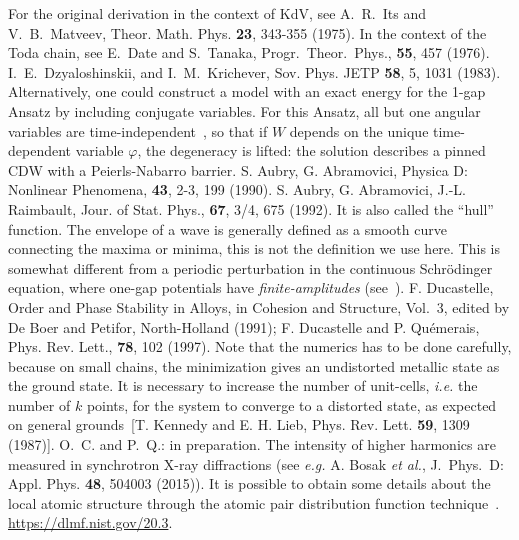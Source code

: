 \documentclass[]{revtex4-1}
\begin{document}
\begin{thebibliography}{99}
 For the original derivation in the context of KdV, see A.~R.~Its and V.~B.~Matveev, Theor. Math. Phys. \textbf{23}, 343-355 (1975). In the context of the Toda chain, see E.~Date and S.~Tanaka, Progr.~Theor.~Phys., \textbf{55}, 457 (1976).
    I.~E.~Dzyaloshinskii, and I.~M.~Krichever, Sov. Phys. JETP \textbf{58}, 5, 1031 (1983).
 Alternatively, one could construct a model with an exact energy for the 1-gap Ansatz by including conjugate variables. For this Ansatz, all but one angular variables are time-independent~\cite{Todabook}, so that if $W$ depends on the unique time-dependent variable $\varphi$, the degeneracy is lifted: the solution describes a pinned CDW with a Peierls-Nabarro barrier. 
 S. Aubry, G. Abramovici, Physica D: Nonlinear Phenomena, \textbf{43}, 2-3, 199 (1990).
 S. Aubry, G. Abramovici, J.-L. Raimbault, Jour. of Stat. Phys., \textbf{67}, 3/4, 675 (1992).
 It is also called the ``hull'' function. The envelope of a wave is generally defined as a smooth curve connecting the maxima or minima, this is not the definition we use here. 
 This is somewhat different from a periodic perturbation in the continuous Schr\"odinger equation, where one-gap potentials have \textit{finite-amplitudes} (see~\cite{notekdv0}).
 F. Ducastelle, Order and Phase Stability in Alloys, in Cohesion and Structure, Vol.~3, edited by De Boer and Petifor, North-Holland (1991);
  F. Ducastelle and P. Qu\'emerais, Phys. Rev. Lett., \textbf{78}, 102 (1997).
 Note that the numerics has to be done carefully, because on small chains, the minimization gives an undistorted metallic state as the ground state. It is necessary to increase the number of unit-cells, \textit{i.e.} the number of $k$ points, for the system to converge to a distorted state, as expected on general grounds~[T. Kennedy and E. H. Lieb, Phys. Rev. Lett. \textbf{59}, 1309 (1987)].
   O.~C. and P.~Q.: in preparation.
   The intensity of higher harmonics are measured in synchrotron X-ray diffractions (see \textit{e.g.} A. Bosak \textit{et al.}, J.~Phys.~D: Appl. Phys. \textbf{48}, 504003 (2015)). It is possible to obtain some details about the local atomic structure through the atomic pair distribution function technique~\cite{malliakas_2}. 
  \href{https://dlmf.nist.gov/20.3}{https://dlmf.nist.gov/20.3}.
\end{thebibliography}

\end{document}
